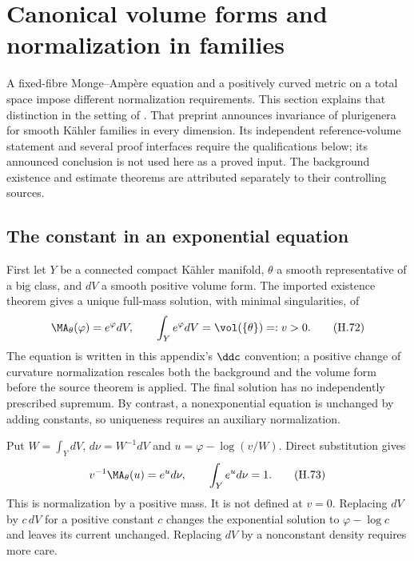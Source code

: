 \section{Canonical volume forms and normalization in families}
\label{sec:appH-KE-family-normalization}

A fixed-fibre Monge--Amp\`ere equation and a positively curved metric
on a total space impose different normalization requirements. This
section explains that distinction in the setting of
\cite{LPWZ26KEV1}. That preprint announces invariance of plurigenera
for smooth K\"ahler families in every dimension. Its independent
reference-volume statement and several proof interfaces require the
qualifications below; its announced conclusion is not used here as
a proved input. The background existence and estimate theorems
are attributed separately to their controlling sources.

\subsection{The constant in an exponential equation}
\label{sec:appH-KE-exponential-constant}

First let $Y$ be a connected compact K\"ahler manifold, $\theta$
a smooth representative of a big class, and $dV$ a smooth positive
volume form. The imported existence theorem
\cite[Theorem~6.1, actual pp.~47--48]{BEGZ10BigV2} gives a unique
full-mass solution, with minimal singularities, of
\begin{equation*}
 \MA_\theta(\varphi)=e^\varphi dV,
 \qquad \int_Y e^\varphi dV=\vol(\{\theta\})=:v>0.
\tag{H.72}\label{eq:appH-KE-exponential-equation}
\end{equation*}
The equation is written in this appendix's $\ddc$ convention;
a positive change of curvature normalization rescales both the
background and the volume form before the source theorem is applied.
The final solution has no independently prescribed supremum. By
contrast, a nonexponential equation is unchanged by adding constants,
so uniqueness requires an auxiliary normalization.

Put $W=\int_YdV$, $d\nu=W^{-1}dV$ and
$u=\varphi-\log(v/W)$. Direct substitution gives
\begin{equation*}
 v^{-1}\MA_\theta(u)=e^u d\nu,
 \qquad \int_Ye^u d\nu=1.
\tag{H.73}\label{eq:appH-KE-probability-equation}
\end{equation*}
This is normalization by a positive mass. It is not defined at $v=0$.
Replacing $dV$ by $c\,dV$ for a positive constant $c$ changes the
exponential solution to $\varphi-\log c$ and leaves its current
unchanged. Replacing $dV$ by a nonconstant density requires more care.

